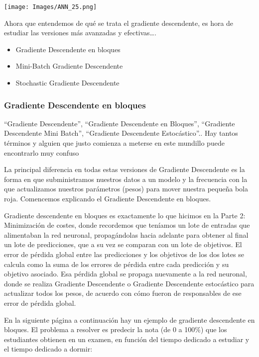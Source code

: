 \documentclass[]{book}
\providecommand{\tightlist}{%
  \setlength{\itemsep}{0pt}\setlength{\parskip}{0pt}}
\begin{document}
\texttt{[image: Images/ANN\_25.png]}

Ahora que entendemos de qué se trata el gradiente descendente, es hora de estudiar las versiones más avanzadas y efectivas\ldots{}.

\begin{itemize}
\tightlist
\item
  Gradiente Descendente en bloques
\item
  Mini-Batch Gradiente Descendente
\item
  Stochastic Gradiente Descendente
\end{itemize}

\hypertarget{gradiente-descendente-en-bloques}{%
\subsubsection{Gradiente Descendente en bloques}\label{gradiente-descendente-en-bloques}}

``Gradiente Descendente'', ``Gradiente Descendente en Bloques'', ``Gradiente Descendente Mini Batch'', ``Gradiente Descendente Estocástico''.. Hay tantos términos y alguien que justo comienza a meterse en este mundillo puede encontrarlo muy confuso

La principal diferencia en todas estas versiones de Gradiente Descendente es la forma en que subministramos nuestros datos a un modelo y la frecuencia con la que actualizamos nuestros parámetros (pesos) para mover nuestra pequeña bola roja. Comencemos explicando el Gradiente Descendente en bloques.

Gradiente descendente en bloques es exactamente lo que hicimos en la Parte 2: Minimización de costes, donde recordemos que teníamos un lote de entradas que alimentaban la red neuronal, propagándolas hacia adelante para obtener al final un lote de predicciones, que a su vez se comparan con un lote de objetivos. El error de pérdida global entre las predicciones y los objetivos de los dos lotes se calcula como la suma de los errores de pérdida entre cada predicción y su objetivo asociado. Esa pérdida global se propaga nuevamente a la red neuronal, donde se realiza Gradiente Descendente o Gradiente Descendente estocástico para actualizar todos los pesos, de acuerdo con cómo fueron de responsables de ese error de pérdida global.

En la siguiente página a continuación hay un ejemplo de gradiente descendente en bloques. El problema a resolver es predecir la nota (de 0 a 100\%) que los estudiantes obtienen en un examen, en función del tiempo dedicado a estudiar y el tiempo dedicado a dormir:
\end{document}
